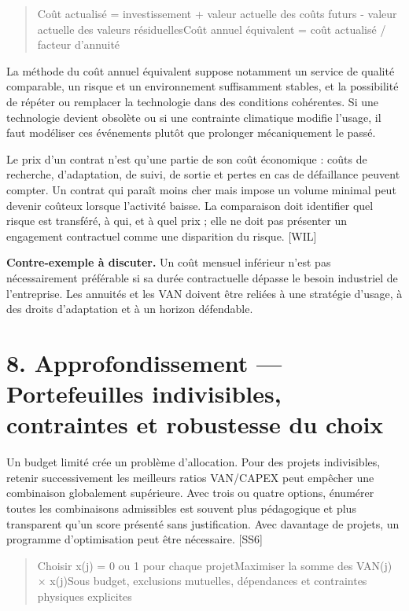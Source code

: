 \documentclass[12pt,a4paper]{article}
\begin{document}
\begin{quote}\small Coût actualisé = investissement + valeur actuelle des coûts futurs - valeur actuelle des valeurs résiduelles\newline Coût annuel équivalent = coût actualisé / facteur d’annuité\end{quote}

La méthode du coût annuel équivalent suppose notamment un service de qualité comparable, un risque et un environnement suffisamment stables, et la possibilité de répéter ou remplacer la technologie dans des conditions cohérentes. Si une technologie devient obsolète ou si une contrainte climatique modifie l’usage, il faut modéliser ces événements plutôt que prolonger mécaniquement le passé.


Le prix d’un contrat n’est qu’une partie de son coût économique : coûts de recherche, d’adaptation, de suivi, de sortie et pertes en cas de défaillance peuvent compter. Un contrat qui paraît moins cher mais impose un volume minimal peut devenir coûteux lorsque l’activité baisse. La comparaison doit identifier quel risque est transféré, à qui, et à quel prix ; elle ne doit pas présenter un engagement contractuel comme une disparition du risque. [WIL]


\textbf{Contre-exemple à discuter.} Un coût mensuel inférieur n’est pas nécessairement préférable si sa durée contractuelle dépasse le besoin industriel de l’entreprise. Les annuités et les VAN doivent être reliées à une stratégie d’usage, à des droits d’adaptation et à un horizon défendable.

\section*{8. Approfondissement --- Portefeuilles indivisibles, contraintes et robustesse du choix}
Un budget limité crée un problème d’allocation. Pour des projets indivisibles, retenir successivement les meilleurs ratios VAN/CAPEX peut empêcher une combinaison globalement supérieure. Avec trois ou quatre options, énumérer toutes les combinaisons admissibles est souvent plus pédagogique et plus transparent qu’un score présenté sans justification. Avec davantage de projets, un programme d’optimisation peut être nécessaire. [SS6]



\begin{quote}\small Choisir x(j) = 0 ou 1 pour chaque projet\newline Maximiser la somme des VAN(j) $\times$ x(j)\newline Sous budget, exclusions mutuelles, dépendances et contraintes physiques explicites\end{quote}
\end{document}
